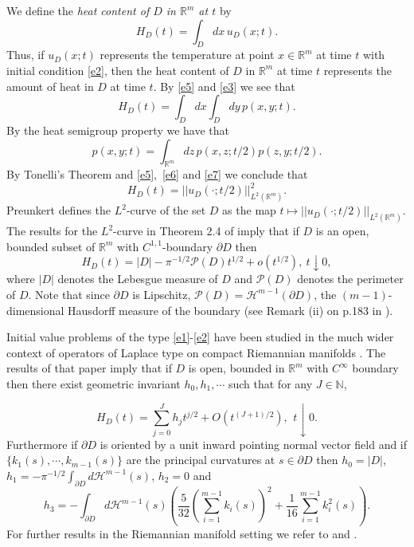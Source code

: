 \documentclass[a4paper,9pt]{amsart}
\begin{document}
We define the \emph{heat content of $D$ in $\mathbb{R}^{m}$ at
$t$} by
\begin{equation}\label{e3}
H_{D}(t)=\int_{D} dx \, u_{D}(x;t).
\end{equation}
Thus, if $u_{D}(x;t)$ represents the temperature at point $x \in
\mathbb{R}^{m}$ at time $t$ with initial condition \eqref{e2},
then the heat content of $D$ in $\mathbb{R}^{m}$ at time $t$
represents the amount of heat in $D$ at time $t$. By \eqref{e5}
and \eqref{e3} we see that
\begin{equation}\label{e6}
H_{D}(t) = \int_{D} dx \int_{D} dy \, p(x,y;t).
\end{equation}
By the heat semigroup property we have that
\begin{equation}\label{e7}
p(x,y;t)=\int_{{\mathbb{R}}^m}dz \, p(x,z;t/2)p(z,y;t/2).
\end{equation}
By Tonelli's Theorem and
\eqref{e5},\ \eqref{e6} and \eqref{e7} we
conclude that
\begin{equation*}
H_D(t)=||u_D(\cdot;t/2)||_{L^2({\mathbb{R}}^m)}^2.
\end{equation*}
Preunkert \cite{mP03} defines the $L^2$-curve of the set $D$ as
the map $t\mapsto ||u_D(\cdot;t/2)||_{L^2({\mathbb{R}}^m)}$. The results for
the $L^2$-curve in Theorem 2.4 of \cite{MPPP07} imply that if $D$
is an open, bounded subset of $\mathbb{R}^{m}$ with
$C^{1,1}$-boundary $\partial D$ then
\begin{equation}\label{e10}
H_{D}(t)=\vert D \vert - \pi^{-1/2}\mathcal{P}(D)t^{1/2} +
o(t^{1/2}),\ t\downarrow 0,
\end{equation}
where $|D|$ denotes the Lebesgue measure of $D$ and
$\mathcal{P}(D)$ denotes the perimeter of $D$. Note that since
$\partial D$ is Lipschitz,
$\mathcal{P}(D)=\mathcal{H}^{m-1}(\partial D)$, the
$(m-1)$-dimensional Hausdorff measure of the boundary (see Remark
(ii) on p.183 in \cite{EG92}).

Initial value problems of the type \eqref{e1}-\eqref{e2} have been
studied in the much wider context of operators of Laplace type on
compact Riemannian manifolds \cite{vdBG}. The results of that
paper imply that if $D$ is open, bounded in ${\mathbb{R}}^m$ with
$C^{\infty}$ boundary then there exist geometric invariant
$h_0,h_1,\cdots$ such that for any $J\in {\mathbb{N}}$,

\begin{equation}\label{e10a}
H_D(t)=\sum_{j=0}^Jh_jt^{j/2}+O(t^{(J+1)/2}),\   \, t\downarrow 0.
\end{equation}
Furthermore if $\partial D$ is oriented by a unit inward pointing
normal vector field and if $\{k_1(s),\cdots,k_{m-1}(s)\}$ are the
principal curvatures at $s \in \partial D$ then $h_0=|D|$,
$h_1=-\pi^{-1/2}\int_{\partial D}d\mathcal{H}^{m-1}(s)$, $h_2=0$
and
\begin{equation*}
h_3=-\int_{\partial
D}d\mathcal{H}^{m-1}(s)\left(\frac{5}{32}\left(\sum_{i=1}^{m-1}k_i(s)\right)^2+\frac{1}{16}\sum_{i=1}^{m-1}k_i^2(s)\right).
\end{equation*}
For further results in the Riemannian manifold setting we refer to
\cite{vdBGK} and \cite{vdBG1}.
\end{document}
